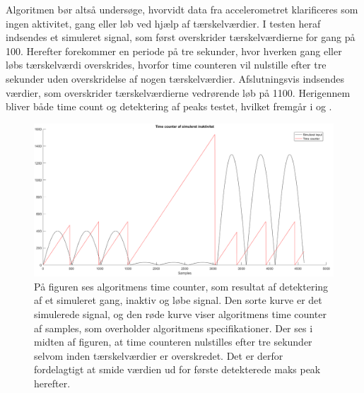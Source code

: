 Algoritmen bør altså undersøge, hvorvidt data fra accelerometret klarificeres som ingen aktivitet, gang eller løb ved hjælp af tærskelværdier. I testen heraf indsendes et simuleret signal, som først overskrider tærskelværdierne for gang på 100. Herefter forekommer en periode på tre sekunder, hvor hverken gang eller løbs tærskelværdi overskrides, hvorfor time counteren vil nulstille efter tre sekunder uden overskridelse af nogen tærskelværdier. Afslutningsvis indsendes værdier, som overskrider tærskelværdierne vedrørende løb på 1100. Herigennem bliver både time count og detektering af peaks testet, hvilket fremgår i  og . 
\begin{figure}[H]
	\centering
	\includegraphics[scale=0.3]{figures/cDesign/test_timecount_inaktiv.png}
	\caption{På figuren ses algoritmens time counter, som resultat af detektering af et simuleret gang, inaktiv og løbe signal. Den sorte kurve er det simulerede signal, og den røde kurve viser algoritmens time counter af samples, som overholder algoritmens specifikationer. Der ses i midten af figuren, at time counteren nulstilles efter tre sekunder selvom inden tærskelværdier er overskredet. Det er derfor fordelagtigt at smide værdien ud for første detekterede maks peak herefter.}
	\label{fig:test_inaktiv_time}
\end{figure}

